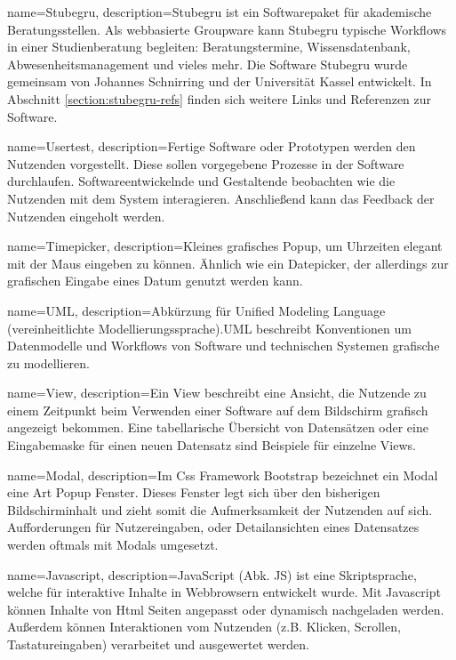 \makeglossaries



{
    name=Stubegru,
    description={Stubegru ist ein Softwarepaket für akademische Beratungsstellen. Als webbasierte Groupware kann Stubegru typische Workflows in einer Studienberatung begleiten: Beratungstermine, Wissensdatenbank, Abwesenheitsmanagement und vieles mehr\cite{stubegruWebsite}. Die Software Stubegru wurde gemeinsam von Johannes Schnirring und der Universität Kassel entwickelt. In Abschnitt \ref{section:stubegru-refs} finden sich weitere Links und Referenzen zur Software.}
}

{
    name=Usertest,
    description={Fertige Software oder Prototypen werden den Nutzenden vorgestellt. Diese sollen vorgegebene Prozesse in der Software durchlaufen. Softwareentwickelnde und Gestaltende beobachten wie die Nutzenden mit dem System interagieren. Anschließend kann das Feedback der Nutzenden eingeholt werden.}
}

{
    name=Timepicker,
    description={Kleines grafisches Popup, um Uhrzeiten elegant mit der Maus eingeben zu können. Ähnlich wie ein Datepicker, der allerdings zur grafischen Eingabe eines Datum genutzt werden kann. \cite{datepicker}}
}

{
    name=UML,
    description={Abkürzung für Unified Modeling Language (vereinheitlichte Modellierungssprache).UML beschreibt Konventionen um Datenmodelle und Workflows von Software und technischen Systemen grafische zu modellieren.\cite{UML}}
}

{
    name=View,
    description={Ein View beschreibt eine Ansicht, die Nutzende zu einem Zeitpunkt beim Verwenden einer Software auf dem Bildschirm grafisch angezeigt bekommen. Eine tabellarische Übersicht von Datensätzen oder eine Eingabemaske für einen neuen Datensatz sind Beispiele für einzelne Views.}
}

{
    name=Modal,
    description={Im \gls{Css} Framework \gls{Bootstrap} bezeichnet ein Modal eine Art Popup Fenster. Dieses Fenster legt sich über den bisherigen Bildschirminhalt und zieht somit die Aufmerksamkeit der Nutzenden auf sich. Aufforderungen für Nutzereingaben, oder Detailansichten eines Datensatzes werden oftmals mit Modals umgesetzt.}
}

{
    name=Javascript,
    description={JavaScript (Abk. JS) ist eine Skriptsprache, welche für interaktive Inhalte in Webbrowsern entwickelt wurde. Mit Javascript können Inhalte von \gls{Html} Seiten angepasst oder dynamisch nachgeladen werden. Außerdem können Interaktionen vom Nutzenden (z.B. Klicken, Scrollen, Tastatureingaben) verarbeitet und ausgewertet werden.\cite{Javascript}}
}

